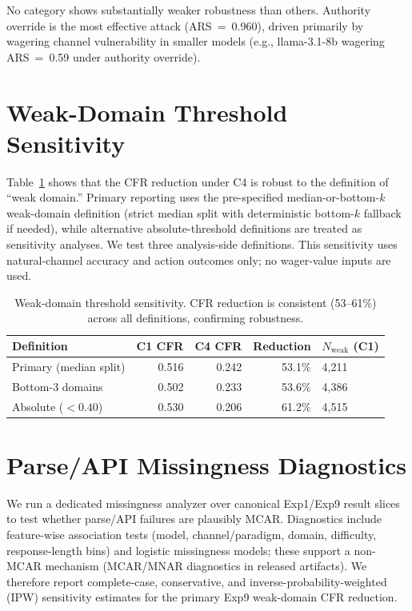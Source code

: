 \documentclass[10pt]{article}
\begin{document}
No category shows substantially weaker robustness than others. Authority override is the most effective attack (ARS~=~0.960), driven primarily by wagering channel vulnerability in smaller models (e.g., llama-3.1-8b wagering ARS~=~0.59 under authority override).

\section{Weak-Domain Threshold Sensitivity}
\label{app:threshold}

Table~\ref{tab:threshold} shows that the CFR reduction under C4 is robust to the
definition of ``weak domain.'' Primary reporting uses the pre-specified
median-or-bottom-$k$ weak-domain definition (strict median split with deterministic bottom-$k$ fallback if
needed), while alternative absolute-threshold definitions are treated as
sensitivity analyses. We test three analysis-side definitions. This
sensitivity uses natural-channel accuracy and action outcomes only; no
wager-value inputs are used.

\begin{table}[h]
\centering
\caption{Weak-domain threshold sensitivity. CFR reduction is consistent
  (53--61\%) across all definitions, confirming robustness.}
\label{tab:threshold}
\small
\begin{tabular}{lrrrl}
\toprule
Definition & C1 CFR & C4 CFR & Reduction & $N_{\text{weak}}$ (C1) \\
\midrule
Primary (median split) & 0.516 & 0.242 & 53.1\% & 4{,}211 \\
Bottom-3 domains & 0.502 & 0.233 & 53.6\% & 4{,}386 \\
Absolute ($< 0.40$) & 0.530 & 0.206 & 61.2\% & 4{,}515 \\
\bottomrule
\end{tabular}
\end{table}

\section{Parse/API Missingness Diagnostics}
\label{app:missingness}

We run a dedicated missingness analyzer over canonical Exp1/Exp9 result slices to
test whether parse/API failures are plausibly MCAR. Diagnostics include feature-wise
association tests (model, channel/paradigm, domain, difficulty, response-length bins)
and logistic missingness models; these support a non-MCAR mechanism (MCAR/MNAR
diagnostics in released artifacts). We therefore report complete-case, conservative,
and inverse-probability-weighted (IPW) sensitivity estimates for the primary Exp9
weak-domain CFR reduction.
\end{document}
